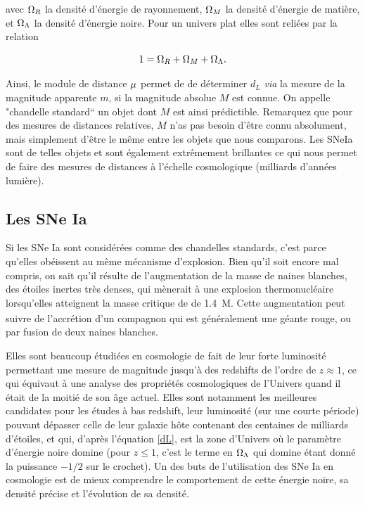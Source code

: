 \documentclass[a4paper, 12pt, svgnames]{article}
\newcommand{\mr}[1]{{\textcolor[rgb]{0.80,0.10,0.1}{#1}}}
\begin{document}
avec $\Omega_R$ la densité d'énergie de rayonnement, $\Omega_M$ la densité d'énergie de
matière, et $\Omega_\Lambda$ la densité d'énergie noire. Pour un univers plat elles sont
reliées par la relation

\begin{equation}
    1 = \Omega_R + \Omega_M + \Omega_\Lambda.
\end{equation}

Ainsi, le module de distance $\mu$ permet de de déterminer $d_L$ \textit{via} la
mesure de la magnitude apparente $m$, si la magnitude absolue $M$ est connue.
\mr{On appelle "chandelle standard“ un objet dont $M$ est ainsi prédictible.
Remarquez que pour des mesures de distances relatives, $M$ n'as pas besoin
d'être connu absolument, mais simplement d'être le même entre les objets que
nous comparons. Les SNeIa sont de telles objets et sont également extrêmement
brillantes ce qui nous permet de faire des mesures de distances à l'échelle
cosmologique (milliards d'années lumière).}

\subsection{Les SNe Ia}\label{ssec:sneia}
Si les SNe Ia sont considérées comme des chandelles standards, c'est parce
qu'elles obéissent au même mécanisme d'explosion. Bien qu'il soit encore mal
compris, on sait qu'il résulte de l'augmentation de la masse de naines
blanches, des étoiles inertes très denses, qui mènerait à une explosion
thermonucléaire lorsqu'elles atteignent la masse critique de 
de \SI{1.4}{M_\odot}. Cette augmentation peut suivre de l'accrétion d'un
compagnon qui est généralement une géante rouge, ou par fusion de deux naines
blanches.

Elles sont beaucoup étudiées en cosmologie de fait de leur forte luminosité
permettant une mesure de magnitude jusqu'à des redshifts de l'ordre de $z
\approx 1$, ce qui équivaut à une analyse des propriétés cosmologiques de
l'Univers quand il était de la moitié de son âge actuel. Elles sont notamment
les meilleures candidates pour les études à bas redshift, leur luminosité (sur
une courte période) pouvant dépasser celle de leur galaxie hôte contenant des
centaines de milliards d'étoiles,  et qui, d'après l'équation \ref{dL}, est la
zone d'Univers où le paramètre d'énergie noire domine (pour $z \leq 1$, c'est le
terme en $\Omega_\Lambda$ qui domine étant donné la puissance $-1/2$ sur le crochet). Un
des buts de l'utilisation des SNe Ia en cosmologie est de mieux comprendre le
comportement de cette énergie noire, sa densité précise et l'évolution de sa
densité.
\end{document}
